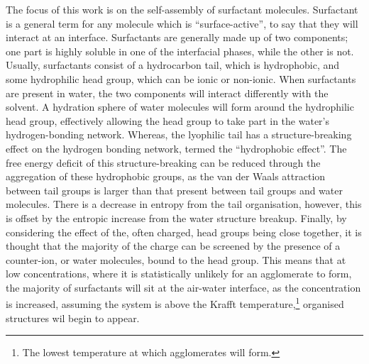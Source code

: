 The focus of this work is on the self-assembly of surfactant molecules.
Surfactant is a general term for any molecule which is ``surface-active'', to say that they will interact at an interface.\autocite{rosen_surfactants_2012}
Surfactants are generally made up of two components; one part is highly soluble in one of the interfacial phases, while the other is not.\autocite{goodwin_colloids_2009}
Usually, surfactants consist of a hydrocarbon tail, which is hydrophobic, and some hydrophilic head group, which can be ionic or non-ionic.
When surfactants are present in water, the two components will interact differently with the solvent.
A hydration sphere of water molecules will form around the hydrophilic head group, effectively allowing the head group to take part in the water's hydrogen-bonding network.
Whereas, the lyophilic tail has a structure-breaking effect on the hydrogen bonding network, termed the ``hydrophobic effect''.
The free energy deficit of this structure-breaking can be reduced through the aggregation of these hydrophobic groups, as the van der Waals attraction between tail groups is larger than that present between tail groups and water molecules.
There is a decrease in entropy from the tail organisation, however, this is offset by the entropic increase from the water structure breakup.
Finally, by considering the effect of the, often charged, head groups being close together, it is thought that the majority of the charge can be screened by the presence of a counter-ion, or water molecules, bound to the head group.\autocite{goodwin_colloids_2009}
This means that at low concentrations, where it is statistically unlikely for an agglomerate to form, the majority of surfactants will sit at the air-water interface, as the concentration is increased, assuming the system is above the Krafft temperature,\footnote{The lowest temperature at which agglomerates will form.} organised structures wil begin to appear.

